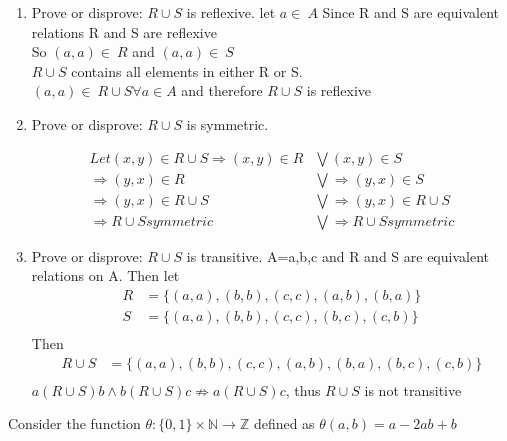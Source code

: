 \documentclass{article}
\begin{document}
\begin{enumerate}
\item Prove or disprove: $R\cup S$ is reflexive.
\answer let $a\in\ A$ Since R and S are equivalent relations R and S are reflexive\\
So $(a,a)\in\ R$ and $(a,a)\in\ S$\\ $R\cup S$ contains all elements in either R or S.\\
$(a,a)\in\ R\cup S \forall a \in A$ and therefore $R\cup S$ is reflexive
\item Prove or disprove: $R\cup S$ is symmetric.

\begin{align*}
 Let (x,y) \in R\cup S\Rightarrow (x,y) \in R  &\bigvee (x,y) \in S \\
\Rightarrow (y,x) \in R  &\bigvee \Rightarrow (y,x) \in S \\
\Rightarrow (y,x) \in R\cup S  &\bigvee \Rightarrow (y,x) \in R\cup S\\   
\Rightarrow R\cup S symmetric &\bigvee \Rightarrow R\cup S symmetric
\end{align*} 
\item Prove or disprove: $R\cup S$ is transitive.
\answer A={a,b,c} and R and S are equivalent relations on A. Then let\\
\begin{align*}
    R &=\{(a,a),(b,b),(c,c),(a,b),(b,a)\}\\
    S &=\{(a,a),(b,b),(c,c),(b,c),(c,b)\}\\
\end{align*}
Then\\
\begin{align*}
    R \cup S &=\{(a,a),(b,b),(c,c),(a,b),(b,a),(b,c),(c,b)\}\\
\end{align*}
$a(R\cup S)b\wedge b(R\cup S)c\nRightarrow a(R\cup S)c$, thus $R\cup S$  is not transitive
\end{enumerate}

\question%
%
Consider the function $\theta : \{0,1\}\times\mathbb{N} \rightarrow \mathbb{Z}$
defined as $\theta(a,b) = a -2ab + b$
\end{document}
